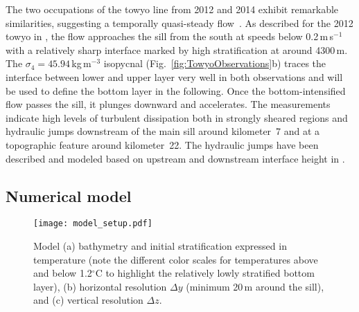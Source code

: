 \documentclass{ametsocV6.1}
\begin{document}
The two occupations of the towyo line from 2012 and 2014 exhibit remarkable similarities, suggesting a temporally quasi-steady flow~\citep{cusacketal19}.
As described for the 2012 towyo in \citet{alfordetal13c}, the flow approaches the sill from the south at speeds below 0.2\,m\,s$^{-1}$ with a relatively sharp interface marked by high stratification at around 4300\,m.
The $\sigma_4=45.94$\,kg\,m$^{-3}$ isopycnal (Fig.~\ref{fig:TowyoObservations}b) traces the interface between lower and upper layer very well in both observations and will be used to define the bottom layer in the following.
Once the bottom-intensified flow passes the sill, it plunges downward and accelerates.
The measurements indicate high levels of turbulent dissipation both in strongly sheared regions and hydraulic jumps downstream of the main sill around kilometer~7 and at a topographic feature around kilometer~22.
The hydraulic jumps have been described and modeled based on upstream and downstream interface height in \citet{thorpeetal18}.

\subsection{Numerical model}\label{sec:Model}

\begin{figure*}
\centerline{\texttt{[image: model\_setup.pdf]}}
\caption{
Model (a) bathymetry and initial stratification expressed in temperature (note the different color scales for temperatures above and below 1.2$^{\circ}$C to highlight the relatively lowly stratified bottom layer), (b) horizontal resolution $\Delta y$ (minimum 20\,m around the sill), and (c) vertical resolution $\Delta z$.
}
\label{fig:ModelBasics}
\end{figure*}
\end{document}
